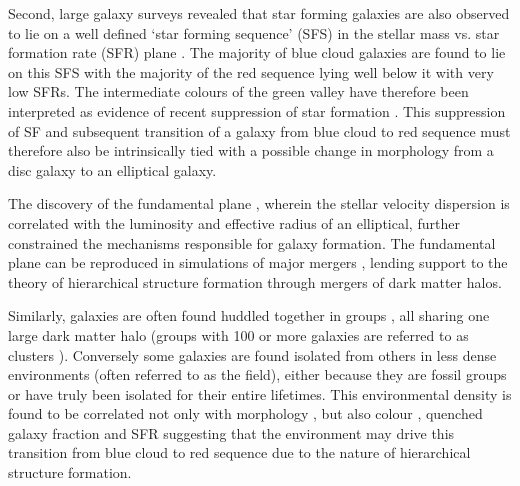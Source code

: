 Second, large galaxy surveys revealed that star forming galaxies are also observed to lie on a well defined `star forming sequence' (SFS) in the stellar mass vs. star formation rate (SFR) plane \citep{brinchmann04, Salim07, daddi07}. The majority of blue cloud galaxies are found to lie on this SFS with the majority of the red sequence lying well below it with very low SFRs. The intermediate colours of the green valley have therefore been interpreted as evidence of recent suppression of star formation \citep[SF;][]{Salim07}. This suppression of SF and subsequent transition of a galaxy from blue cloud to red sequence must therefore also be intrinsically tied with a possible change in morphology from a disc galaxy to an elliptical galaxy.

The discovery of the fundamental plane \citep{dressler87, djorgovski87}, wherein the stellar velocity dispersion is correlated with the luminosity and effective radius of an elliptical, further constrained the mechanisms responsible for galaxy formation. The fundamental plane can be reproduced in simulations of major mergers \citep{bekki98, nipoti03, boylan05, robertson06, hilz12, taranu15}, lending support to the theory of hierarchical structure formation through mergers of dark matter halos. 

Similarly, galaxies are often found huddled together in groups \citep{zwicky38, zwicky52, abell58}, all sharing one large dark matter halo (groups with 100 or more galaxies are referred to as clusters \citealt{bower04}). Conversely some galaxies are found isolated from others in less dense environments (often referred to as the field), either because they are fossil groups \citep[where all members have eventually merged][]{ponman94, jones00, jones03} or have truly been isolated for their entire lifetimes. This environmental density is found to be correlated not only with morphology \citep[][and see Figure~\ref{fig:dressler}]{dressler80, smail97, poggianti99, postman05, Bamford09}, but also colour \citep{butcher78, pimbblet02}, quenched galaxy fraction \citep{kauffmann03, Baldry06, peng12, darvish16} and SFR \citep{gomez03} suggesting that the environment may drive this transition from blue cloud to red sequence due to the nature of hierarchical structure formation. 


